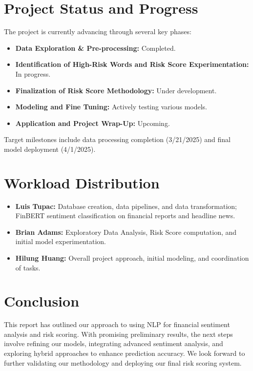 \documentclass[twocolumn]{article}
\begin{document}
\section{Project Status and Progress}
The project is currently advancing through several key phases:
\begin{itemize}
    \item \textbf{Data Exploration \& Pre-processing:} Completed.
    \item \textbf{Identification of High-Risk Words and Risk Score Experimentation:} In progress.
    \item \textbf{Finalization of Risk Score Methodology:} Under development.
    \item \textbf{Modeling and Fine Tuning:} Actively testing various models.
    \item \textbf{Application and Project Wrap-Up:} Upcoming.
\end{itemize}
Target milestones include data processing completion (3/21/2025) and final model deployment (4/1/2025).

\section{Workload Distribution}
\begin{itemize}
    \item \textbf{Luis Tupac:} Database creation, data pipelines, and data transformation; FinBERT sentiment classification on financial reports and headline news.
    \item \textbf{Brian Adams:} Exploratory Data Analysis, Risk Score computation, and initial model experimentation.
    \item \textbf{Hilung Huang:} Overall project approach, initial modeling, and coordination of tasks.
\end{itemize}

\section{Conclusion}
This report has outlined our approach to using NLP for financial sentiment analysis and risk scoring. With promising preliminary results, the next steps involve refining our models, integrating advanced sentiment analysis, and exploring hybrid approaches to enhance prediction accuracy. We look forward to further validating our methodology and deploying our final risk scoring system.


\end{document}

